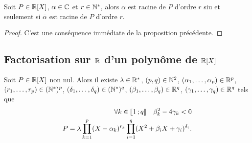   \begin{prop}
    Soit \(P \in \mathbb{R}[X]\), \(\alpha \in \mathbb{C}\) et \(r \in \mathbb{N}^*\), alors \(\alpha\) est racine de \(P\) d'ordre \(r\) siu et seulement si \(\bar{\alpha}\) est racine de \(P\) d'ordre \(r\).
  \end{prop}
  \begin{proof}
    C'est une conséquence immédiate de la proposition précédente.
  \end{proof}

  \subsection{Factorisation sur \(\mathbb{R}\) d'un polynôme de \(\mathbb{R}[X]\)}

  \begin{theo}
    Soit \(P \in \mathbb{R}[X]\) non nul. Alors il existe \(\lambda \in \mathbb{R}^*\), \((p,q) \in \mathbb{N}^2\), \((\alpha_1, \ldots, \alpha_p) \in \mathbb{R}^p\), \((r_1, \ldots, r_p) \in (\mathbb{N}^*)^p\), \((\delta_1, \ldots, \delta_q) \in (\mathbb{N}^*)^q\), \((\beta_1, \ldots, \beta_q) \in \mathbb{R}^q\), \((\gamma_1, \ldots, \gamma_q) \in \mathbb{R}^q\) tels que
    \begin{align}
      \forall k \in \mathopen{\llbracket}1\mathclose{}\mathpunct{};q\mathclose{\rrbracket} \quad \beta_k^2 - 4\gamma_k <0\\
      P = \lambda \prod_{k=1}^p (X-\alpha_k)^{r_k} \prod_{i=1}^q(X^2+\beta_i X+\gamma_i)^{\delta_i}.
    \end{align}
  \end{theo}
